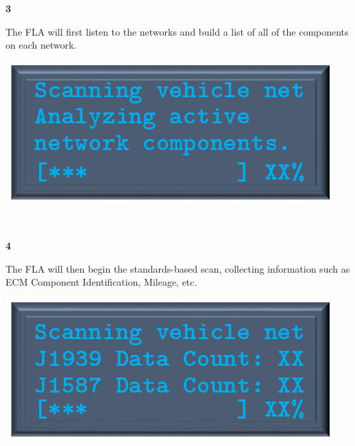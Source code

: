 \documentclass[11pt, oneside]{book}
\begin{document}
\noindent\begin{minipage}{0.45\textwidth}%
\begin{center}
\textbf{3}\\[\baselineskip]
\end{center}
The FLA will first listen to the
networks and build a list of all
of the components on each network.
\end{minipage}%
\hfill%
\begin{minipage}{0.45\textwidth}
\includegraphics[width=\linewidth]{../media/pstricks_files/13_scanning_network_components}
\end{minipage}
\\[\baselineskip]
\noindent\begin{minipage}{0.45\textwidth}%
\begin{center}
\textbf{4}\\[\baselineskip]
\end{center}
The FLA will then begin the standards-based scan, collecting information such as ECM Component Identification, Mileage, etc.
\end{minipage}%
\hfill%
\begin{minipage}{0.45\textwidth}
\includegraphics[width=\linewidth]{../media/pstricks_files/14_scanning_network_count}
\end{minipage}
\\[\baselineskip]
\end{document}
